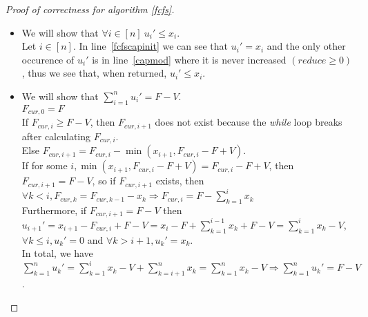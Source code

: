 \begin{proof}[Proof of correctness for algorithm \ref{fcfs}]
   \begin{itemize}
      \item We will show that $\forall i \in [n] \: u_i' \leq x_i$. \\
      Let $i \in [n]$. In line~\ref{fcfscapinit} we can see that $u_i' = x_i$ and the only other occurence of $u_i'$
      is in line~\ref{capmod} where it is never increased $(reduce \geq 0)$, thus we see that, when returned,
      $u_i' \leq x_i$.
      \item We will show that $\sum\limits_{i=1}^{n}u_i' = F - V$. \\
      $F_{cur,0} = F$ \\
      If $F_{cur,i} \geq F - V$, then $F_{cur,i+1}$ does not exist because the \emph{while} loop breaks after calculating
      $F_{cur,i}$. \\
      Else $F_{cur,i+1} = F_{cur,i} - \min{(x_{i+1}, F_{cur,i} - F + V)}$. \\
      If for some $i, \min{(x_{i+1}, F_{cur,i} - F + V)} = F_{cur,i} - F + V$, then $F_{cur,i+1} = F - V$, so if
      $F_{cur,i+1}$ exists, then $\forall k < i, F_{cur,k} = F_{cur,k-1} - x_k \Rightarrow F_{cur,i} =
      F - \sum\limits_{k=1}^{i}x_k$ \\
      Furthermore, if $F_{cur,i+1} = F - V$ then $u_{i+1}' = x_{i+1} - F_{cur,i} + F - V =
      x_i - F + \sum\limits_{k=1}^{i-1}x_k + F - V = \sum\limits_{k=1}^{i}x_k - V$, $\forall k \leq i, u_k' = 0$
      and $\forall k > i+1, u_k' = x_k$. \\
      In total, we have $\sum\limits_{k=1}^{n}u_k' = \sum\limits_{k=1}^{i}x_k - V + \sum\limits_{k=i+1}^{n}x_k =
      \sum\limits_{k=1}^{n}x_k - V \Rightarrow \sum\limits_{k=1}^{n}u_k' = F - V$.
   \end{itemize}
\end{proof}
